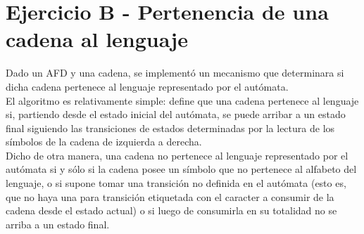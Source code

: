 \section{Ejercicio B - Pertenencia de una cadena al lenguaje}
\indent \indent Dado un AFD y una cadena, se implementó un mecanismo que determinara si dicha cadena pertenece al lenguaje representado por el autómata.\\
\indent El algoritmo es relativamente simple: define que una cadena pertenece al lenguaje si, partiendo desde el estado inicial del autómata, se puede arribar a un estado final siguiendo las transiciones de estados determinadas por la lectura de los símbolos de la cadena de izquierda a derecha.\\
\indent Dicho de otra manera, una cadena no pertenece al lenguaje representado por el autómata si y sólo si la cadena posee un símbolo que no pertenece al alfabeto del lenguaje, o si supone tomar una transición no definida en el autómata (esto es, que no haya una para transición etiquetada con el caracter a consumir de la cadena desde el estado actual) o si luego de consumirla en su totalidad no se arriba a un estado final.\\
